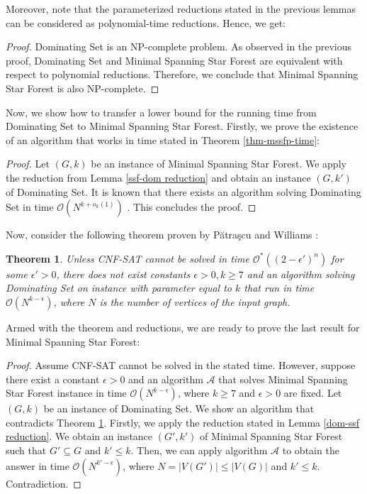 \documentclass[en]{pracamgr}
\newtheorem{theorem}{Theorem}
\theoremstyle{definition}
\newcommand{\mssfp}{{\sc Minimal Spanning Star Forest}}
\newcommand{\domsetp}{{\sc Dominating Set}}
\newcommand{\cnfsat}{{\sc CNF-SAT}}
\begin{document}
Moreover, note that the parameterized reductions stated in the previous lemmas can be considered as polynomial-time reductions. Hence, we get:

\thmmssfpnpc*

\begin{proof}
	\domsetp{} is an NP-complete problem. As observed in the previous proof, \domsetp{} and \mssfp{} are equivalent with respect to polynomial reductions. Therefore, we conclude that \mssfp{} is  also NP-complete.
\end{proof}

Now, we show how to transfer a lower bound for the running time from \domsetp{} to \mssfp{}. Firstly, we prove the existence of an algorithm that works in time stated in Theorem \ref{thm-mssfp-time}:

\thmmssfptime*

\begin{proof}
	Let $(G,k)$ be an instance of \mssfp{}. We apply the reduction from Lemma \ref{ssf-dom reduction} and obtain an instance $(G,k')$ of \domsetp{}. It is known that there exists an algorithm solving \domsetp{} in time $\mathcal{O}(N^{k + o_k(1)})$ \cite{DomSetAlg}. This concludes the proof.
\end{proof}

Now, consider the following theorem proven by Pătraşcu and Williams \cite{DomSet}:

\begin{theorem}\label{domset-seth}
	Unless \cnfsat{} cannot be solved in time $\mathcal{O}^*((2-\epsilon')^n)$ for some $\epsilon' > 0$, there does not exist constants $\epsilon > 0, k \geq 7$ and an algorithm solving \domsetp{} on instance with parameter equal to $k$ that run in time $\mathcal{O}(N^{k-\epsilon})$, where $N$ is the number of vertices of the input graph.
\end{theorem}

Armed with the theorem and reductions, we are ready to prove the last result for \mssfp{}:

\thmmssfplowerbound*

\begin{proof}
	Assume \cnfsat{} cannot be solved in the stated time. However, suppose there exist a constant $\epsilon > 0$ and an algorithm $\mathcal{A}$ that solves \mssfp{} instance in time $\mathcal{O}(N^{k-\epsilon})$, where $k \geq 7$ and $\epsilon > 0$ are fixed. Let $(G,k)$ be an instance of \domsetp{}. We show an algorithm that contradicts Theorem \ref{domset-seth}. Firstly, we apply the reduction stated in Lemma \ref{dom-ssf reduction}. We obtain an instance $(G',k')$ of \mssfp{} such that $G' \subseteq G$ and $k' \leq k$. Then, we can apply algorithm $\mathcal{A}$ to obtain the answer in time $\mathcal{O}(N^{k'-\epsilon})$, where $N=|V(G')| \leq |V(G)|$ and $k'\leq k$. Contradiction.
\end{proof}
\end{document}
